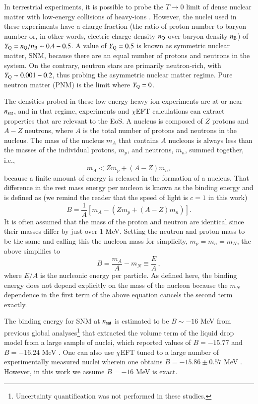 \documentclass[aps,prd,nofootinbib,tightenlines,notitlepage,floatfix,superscriptaddress,showkeys,twocolumn]{revtex4-1}
\newcommand{\CEFT}{$\chi$EFT }
\begin{document}
In terrestrial experiments, it is possible to probe the $T \rightarrow 0$ limit of dense nuclear matter with low-energy collisions of heavy-ions \cite{MUSES:2023hyz}. However, the nuclei used in these experiments have a charge fraction (the ratio of proton number to baryon number or, in other words, electric charge density $n_{\rm Q} $ over baryon density $n_{\rm B} $) of $Y_{\rm Q}=n_{\rm Q}/n_{\rm B}  \sim 0.4-0.5$. A value of $Y_{\rm Q}=0.5$ is known as symmetric nuclear matter, SNM, because there are an equal number of protons and neutrons in the system. On the contrary, neutron stars are primarily neutron-rich, with $Y_{\rm Q}\sim0.001-0.2$, thus probing the asymmetric nuclear matter regime. Pure neutron matter (PNM) is the limit where $Y_{\rm Q}=0$. 

The densities probed in these low-energy heavy-ion experiments are at or near $n_{\rm sat}$, and in that regime, experiments and \CEFT  calculations can extract properties that are relevant to the EoS.  A nucleus is composed of $Z$ protons and $A-Z$ neutrons, where $A$ is the total number of protons and neutrons in the nucleus. The mass of the nucleus $m_A$ that contains $A$ nucleons is always less than the masses of the individual protons, $m_p$, and neutrons, $m_n$, summed together, i.e.,
\begin{equation}
    m_A<Zm_p+(A-Z)m_n,
\end{equation}
because a finite amount of energy is released in the formation of a nucleus.  That difference in the rest mass energy per nucleon is known as the binding energy and is defined as (we remind the reader that the speed of light is $c=1$ in this work)
\begin{equation}
    B=\frac{1}{A}\left[m_A -\left(Zm_p+(A-Z)m_n\right)\right].
\end{equation}
It is often assumed that the mass of the proton and neutron are identical since their masses differ by just over $1$ MeV.  Setting the neutron and proton mass to be the same and calling this the nucleon mass for simplicity, $m_p = m_n = m_N$, the above simplifies to
\begin{equation}
    B=\frac{m_A}{A}-m_{N}\equiv \frac{E}{A}\, ,
\end{equation}
where $E/A$ is the nucleonic energy per particle.
As defined here, the binding energy does not depend explicitly on the mass of the nucleon because the $m_N$ dependence in the first term of the above equation cancels the second term exactly. 

The binding energy for SNM at $n_{\rm sat}$ is estimated to be $B\sim-16$ MeV from previous global analyses\footnote{Uncertainty quantification was not performed in these studies.} that extracted the volume term of the liquid drop model from a large sample of nuclei, which reported values of $B= - 15.77$ \cite{Myers:1966zz} and $B= - 16.24$ MeV \cite{Myers:1995wx}. One can also use \CEFT tuned to a large number of experimentally measured nuclei wherein one obtains $B=-15.86\pm 0.57$ MeV \cite{Drischler:2020yad}. However, in this work we assume $B=-16$ MeV is exact. 
\end{document}
